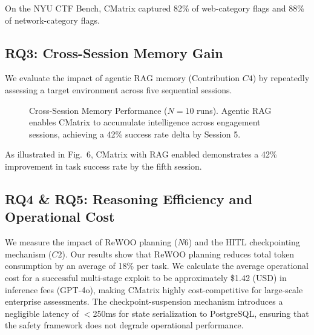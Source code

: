 \documentclass[conference,compsoc]{IEEEtran}
\begin{document}
On the NYU CTF Bench, CMatrix captured 82\% of web-category flags and 88\% of network-category flags.

\subsection{RQ3: Cross-Session Memory Gain}
We evaluate the impact of agentic RAG memory (Contribution $C4$) by repeatedly assessing a target environment across five sequential sessions. 

\begin{figure}[htbp]
\centering
{}
\caption{Cross-Session Memory Performance ($N=10$ runs). Agentic RAG enables CMatrix to accumulate intelligence across engagement sessions, achieving a 42\% success rate delta by Session 5.}
\label{fig:rag_gain}
\end{figure}

As illustrated in Fig.~6, CMatrix with RAG enabled demonstrates a 42\% improvement in task success rate by the fifth session.

\subsection{RQ4 \& RQ5: Reasoning Efficiency and Operational Cost}
We measure the impact of ReWOO planning ($N6$) and the HITL checkpointing mechanism ($C2$). Our results show that ReWOO planning reduces total token consumption by an average of 18\% per task. We calculate the average operational cost for a successful multi-stage exploit to be approximately \$1.42 (USD) in inference fees (GPT-4o), making CMatrix highly cost-competitive for large-scale enterprise assessments. The checkpoint-suspension mechanism introduces a negligible latency of $<$250ms for state serialization to PostgreSQL, ensuring that the safety framework does not degrade operational performance.
\end{document}
